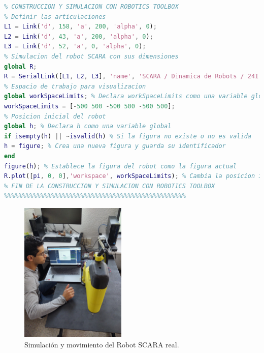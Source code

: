 \documentclass[final]{foresj}
\begin{document}
\begin{lstlisting}[language=Matlab]
%%%%%%%%%%%%%%%%%%%%%%%%%%%%%%%%%%%%%%%%%%%%%%%%%%
% CONSTRUCCION Y SIMULACION CON ROBOTICS TOOLBOX
% Definir las articulaciones
L1 = Link('d', 158, 'a', 200, 'alpha', 0);
L2 = Link('d', 43, 'a', 200, 'alpha', 0);
L3 = Link('d', 52, 'a', 0, 'alpha', 0);
% Simulacion del robot SCARA con sus dimensiones
global R;
R = SerialLink([L1, L2, L3], 'name', 'SCARA / Dinamica de Robots / 24I');
% Espacio de trabajo para visualizacion
global workSpaceLimits; % Declara workSpaceLimits como una variable global
workSpaceLimits = [-500 500 -500 500 -500 500];
% Posicion inicial del robot
global h; % Declara h como una variable global
if isempty(h) || ~isvalid(h) % Si la figura no existe o no es valida
h = figure; % Crea una nueva figura y guarda su identificador
end
figure(h); % Establece la figura del robot como la figura actual
R.plot([pi, 0, 0],'workspace', workSpaceLimits); % Cambia la posicion inicial a q1 = 180 grados
% FIN DE LA CONSTRUCCION Y SIMULACION CON ROBOTICS TOOLBOX
%%%%%%%%%%%%%%%%%%%%%%%%%%%%%%%%%%%%%%%%%%%%%%%%%%
\end{lstlisting}

\begin{figure}[h!]
\centering
\includegraphics[width=0.45\textwidth]{SCARA5.jpg}
\caption{Simulación y movimiento del Robot SCARA real.}
\label{fig:my_label}
\end{figure}
\end{document}
